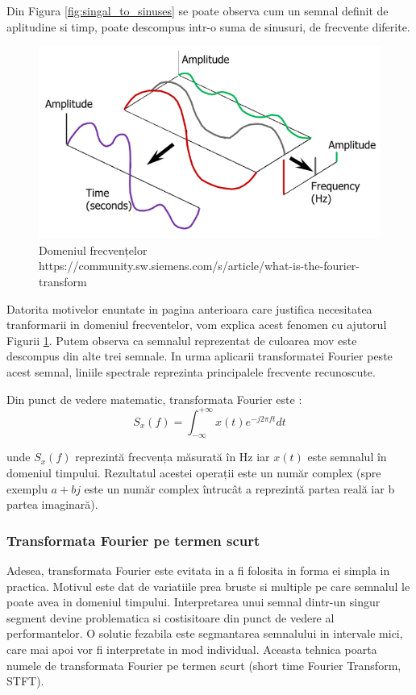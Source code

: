 \documentclass[a4paper, 12pt]{report}
\begin{document}
	Din Figura \ref{fig:singal_to_sinuses} se poate observa cum un semnal definit de aplitudine si timp, poate descompus intr-o suma de sinusuri, de frecvente diferite.
	
	\begin{figure}[H]
		\begin{center}
			\includegraphics[scale=0.7]{images/FT_time_to_freq}
		\end{center}
		\caption{Domeniul frecvențelor \newline
			\hspace{\linewidth}https://community.sw.siemens.com/s/article/what-is-the-fourier-transform}
		\label{fig:signal_to_freq}
	\end{figure}

	Datorita motivelor enuntate in pagina anterioara care justifica necesitatea tranformarii in domeniul frecventelor, vom explica acest fenomen cu ajutorul Figurii \ref{fig:signal_to_freq}. Putem observa ca semnalul reprezentat de culoarea mov este descompus din alte trei semnale. In urma aplicarii transformatei Fourier peste acest semnal, liniile spectrale reprezinta principalele frecvente recunoscute.
	
	Din punct de vedere matematic, transformata Fourier este :
	\begin{equation}
		\label{ft_equation}
		S_x(f) = \int_{-\infty}^{+\infty} x(t)e^{-j2 \pi ft} dt
	\end{equation}
	
	unde $S_x(f)$ reprezintă frecvența măsurată în Hz iar $x(t)$ este semnalul în domeniul timpului. Rezultatul acestei operații este un număr complex (spre exemplu $a + bj$ este un număr complex întrucât a reprezintă partea reală iar b partea imaginară).
	
	\subsubsection{Transformata Fourier pe termen scurt}
	Adesea, transformata Fourier este evitata in a fi folosita in forma ei simpla in practica. Motivul este dat de variatiile prea bruste si multiple pe care semnalul le poate avea in domeniul timpului. Interpretarea unui semnal dintr-un singur segment devine problematica si costisitoare din punct de vedere al performantelor. O solutie fezabila este segmantarea semnalului in intervale mici, care mai apoi vor fi interpretate in mod individual. Aceasta tehnica poarta numele de transformata Fourier pe termen scurt (short time Fourier Transform, STFT).
	
\end{document}
